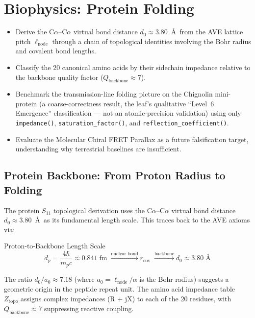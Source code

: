 
\chapter{Biophysics: Protein Folding}
\label{ch:biophysics}


\begin{objectivebox}
\begin{itemize}
    \item Derive the C$\alpha$--C$\alpha$ virtual bond distance $d_0 \approx 3.80$~\AA\ from the AVE lattice pitch $\ell_{\text{node}}$ through a chain of topological identities involving the Bohr radius and covalent bond lengths.
    \item Classify the 20 canonical amino acids by their sidechain impedance relative to the backbone quality factor ($Q_{\text{backbone}} \approx 7$).
    \item Benchmark the transmission-line folding picture on the Chignolin mini-protein (a coarse-correctness result, the leaf's qualitative ``Level~6 Emergence'' classification --- not an atomic-precision validation) using only \texttt{impedance()}, \texttt{saturation\_factor()}, and \texttt{reflection\_coefficient()}.
    \item Evaluate the Molecular Chiral FRET Parallax as a future falsification target, understanding why terrestrial baselines are insufficient.
\end{itemize}
\end{objectivebox}

\section{Protein Backbone: From Proton Radius to Folding}
\label{sec:protein_bridge}

The protein $S_{11}$ topological derivation uses the C$\alpha$--C$\alpha$
virtual bond distance $d_0 \approx 3.80$~\AA\ as its fundamental
length scale.  This traces back to the AVE axioms via:
\begin{resultbox}{Proton-to-Backbone Length Scale}
\begin{equation}
    d_p = \frac{4\hbar}{m_p c} \approx 0.841\;\text{fm}
    \;\xrightarrow{\text{nuclear bond}}
    r_{\text{cov}}
    \;\xrightarrow{\text{backbone}}
    d_0 \approx 3.80\;\text{\AA}
\end{equation}
\end{resultbox}
The ratio $d_0 / a_0 \approx 7.18$ (where $a_0 = \ell_{\text{node}}
/\alpha$ is the Bohr radius) suggests a geometric origin in the
peptide repeat unit.  The amino acid impedance table $Z_{\text{topo}}$
assigns complex impedances (R + jX) to each of the 20 residues,
with $Q_{\text{backbone}} \approx 7$ suppressing reactive coupling.

